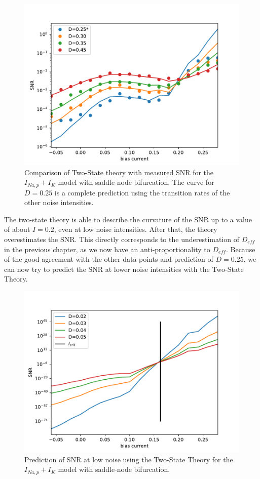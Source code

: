 \documentclass[12pt,a4paper]{article}
\begin{document}
\begin{figure}[H]
	\centering
	\includegraphics[scale=1]{snrtwostateneurcorsh3.pdf}\caption{Comparison of Two-State theory with measured SNR for the $I_{Na,p}+I_K$ model with saddle-node bifurcation. The curve for $D=0.25$ is a complete prediction using the transition rates of the other noise intensities.}
	\label{specneurtst}
\end{figure}
The two-state theory is able to describe the curvature of the SNR up to a value of about $I=0.2$, even at low noise intensities. After that, the theory overestimates the SNR. This directly corresponds to the underestimation of $D_{eff}$ in the previous chapter, as we now have an anti-proportionality to $D_{eff}$.
Because of the good agreement with the other data points and prediction of $D=0.25$, we can now try to predict the SNR at lower noise intensities with the Two-State Theory.
\begin{figure}[H]
	\centering
	\includegraphics[scale=1]{snrpredneur.pdf}\caption{Prediction of SNR at low noise  using the Two-State Theory for the $I_{Na,p}+I_K$ model with saddle-node bifurcation.}
	\label{snrpredsn}
\end{figure}
\end{document}
